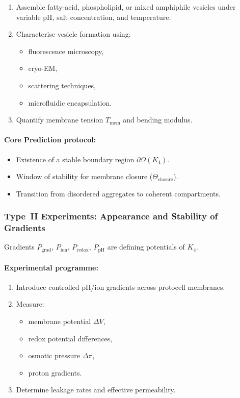 \begin{enumerate}
    \item Assemble fatty-acid, phospholipid, or mixed amphiphile vesicles
          under variable pH, salt concentration, and temperature.
    \item Characterise vesicle formation using:
          \begin{itemize}
              \item fluorescence microscopy,
              \item cryo-EM,
              \item scattering techniques,
              \item microfluidic encapsulation.
          \end{itemize}
    \item Quantify membrane tension $T_{\mathrm{mem}}$ and bending modulus.
\end{enumerate}

\paragraph{Core Prediction protocol:}

\begin{itemize}
    \item Existence of a stable boundary region $\partial\Omega(K_4)$.
    \item Window of stability for membrane closure
          ($\Theta_{\mathrm{closure}}$).
    \item Transition from disordered aggregates to coherent compartments.
\end{itemize}



\subsubsection{Type~II Experiments: Appearance and Stability of Gradients}

Gradients $P_{\mathrm{grad}}$, $P_{\mathrm{ion}}$,
$P_{\mathrm{redox}}$, $P_{\mathrm{pH}}$ are defining potentials of $K_4$.

\paragraph{Experimental programme:}

\begin{enumerate}
    \item Introduce controlled pH/ion gradients across protocell membranes.
    \item Measure:
          \begin{itemize}
              \item membrane potential $\Delta V$,
              \item redox potential differences,
              \item osmotic pressure $\Delta\pi$,
              \item proton gradients.
          \end{itemize}
    \item Determine leakage rates and effective permeability.
\end{enumerate}


